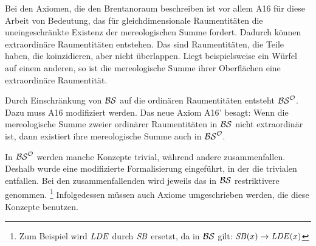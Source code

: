    Bei
    den Axiomen, die den Brentanoraum beschreiben ist vor allem A16 für diese Arbeit von Bedeutung, das für gleichdimensionale Raumentitäten die uneingeschränkte Existenz der mereologischen Summe fordert.
    Dadurch können extraordinäre Raumentitäten entstehen. 
    Das sind Raumentitäten, die Teile haben, die koinzidieren, aber nicht überlappen.
    Liegt beispielsweise ein Würfel auf einem anderen, so ist die mereologische Summe ihrer Oberflächen eine extraordinäre Raumentität.
    
    Durch
    Einschränkung von $\mathcal{BS}$ auf die ordinären Raumentitäten entsteht $\mathcal{BS}^{\mathcal{O}}$.
    Dazu muss A16 modifiziert werden.
    Das neue Axiom A16' besagt: Wenn die mereologische Summe zweier ordinärer Raumentitäten in $\mathcal{BS}$ nicht extraordinär ist, dann existiert ihre mereologische Summe auch in $\mathcal{BS}^{\mathcal{O}}$.
    
    In
    $\mathcal{BS}^{\mathcal{O}}$ werden manche Konzepte trivial, während andere zusammenfallen.
    Deshalb wurde eine modifizierte Formalisierung eingeführt, in der die trivialen entfallen.
    Bei den zusammenfallenden wird jeweils das in $\mathcal{BS}$ restriktivere genommen.%
    \footnote{
        Zum Beispiel wird $\mathit{LDE}$ durch $\mathit{S\hspace*{-0.25ex}B}$ ersetzt, da in $\mathcal{BS}$ gilt: $\mathit{S\hspace*{-0.25ex}B}(x) \to \mathit{LDE}(x)$
    }
    Infolgedessen müssen auch Axiome umgeschrieben werden, die diese Konzepte benutzen.
    
    
